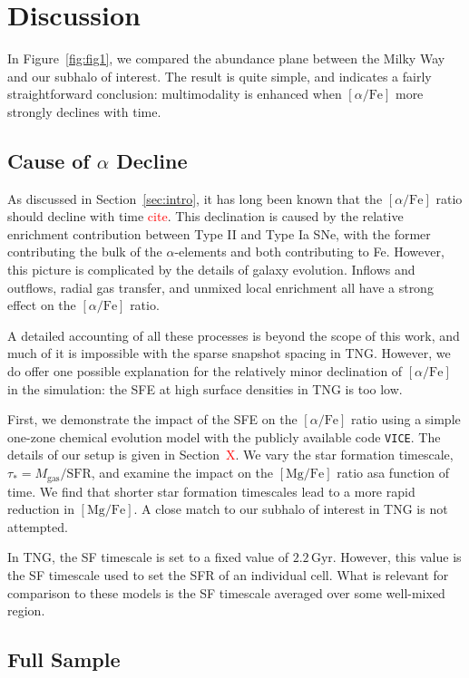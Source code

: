 \documentclass[linenumbers, twocolumn]{aastex631}
\newcommand{\Gyr}{\ensuremath{\textrm{Gyr}}}
\newcommand{\MgFe}{\ensuremath{[\textrm{Mg}/\textrm{Fe}]}}
\newcommand{\alphaFe}{\ensuremath{[\alpha/\textrm{Fe}]}}
\newcommand{\red}[1]{\textcolor{red}{#1}}
\begin{document}
\section{Discussion}\label{sec:disc}
In Figure~\ref{fig:fig1}, we compared the abundance plane between the Milky Way and our subhalo of interest. The result is quite simple, and indicates a fairly straightforward conclusion: multimodality is enhanced when \alphaFe{} more strongly declines with time. 

\subsection{Cause of $\alpha$ Decline}\label{ssec:sfe}
As discussed in Section~\ref{sec:intro}, it has long been known that the \alphaFe{} ratio should decline with time \red{cite}. This declination is caused by the relative enrichment contribution between Type II and Type Ia SNe, with the former contributing the bulk of the $\alpha$-elements and both contributing to Fe. However, this picture is complicated by the details of galaxy evolution. Inflows and outflows, radial gas transfer, and unmixed local enrichment all have a strong effect on the \alphaFe{} ratio.

A detailed accounting of all these processes is beyond the scope of this work, and much of it is impossible with the sparse snapshot spacing in TNG. However, we do offer one possible explanation for the relatively minor declination of \alphaFe{} in the simulation: the SFE at high surface densities in TNG is too low.

First, we demonstrate the impact of the SFE on the \alphaFe{} ratio using a simple one-zone chemical evolution model with the publicly available code \texttt{VICE}. The details of our setup is given in Section~\red{X}. We vary the star formation timescale, $\tau_{*}=M_{\textrm{gas}}/\textrm{SFR}$, and examine the impact on the \MgFe{} ratio asa function of time. We find that shorter star formation timescales lead to a more rapid reduction in \MgFe{}. A close match to our subhalo of interest in TNG is not attempted.

In TNG, the SF timescale is set to a fixed value of $2.2\,\Gyr$. However, this value is the SF timescale used to set the SFR of an individual cell. What is relevant for comparison to these models is the SF timescale averaged over some well-mixed region. 

\subsection{Full Sample}\label{ssec:fullsamp}
\end{document}
